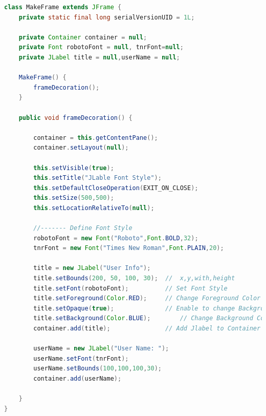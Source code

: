 \begin{frame}

\begin{lstlisting}[language=java]
class MakeFrame extends JFrame {
	private static final long serialVersionUID = 1L;
	
	private Container container = null;
	private Font robotoFont = null, tnrFont=null;
	private JLabel title = null,userName = null;
	
	MakeFrame() {
		frameDecoration();
	}
	
	public void frameDecoration() {

		container = this.getContentPane();
		container.setLayout(null);
		
		this.setVisible(true);
		this.setTitle("JLable Font Style");
		this.setDefaultCloseOperation(EXIT_ON_CLOSE);
		this.setSize(500,500);
		this.setLocationRelativeTo(null);
		
		//------- Define Font Style
		robotoFont = new Font("Roboto",Font.BOLD,32);
		tnrFont = new Font("Times New Roman",Font.PLAIN,20);
		
		title = new JLabel("User Info");
		title.setBounds(200, 50, 100, 30); 	//	x,y,with,height
		title.setFont(robotoFont);			// Set Font Style
		title.setForeground(Color.RED);		// Change Foreground Color
		title.setOpaque(true);				// Enable to change Background Color
		title.setBackground(Color.BLUE);		// Change Background Color
		container.add(title);				// Add Jlabel to Container
		
		userName = new JLabel("User Name: ");
		userName.setFont(tnrFont);
		userName.setBounds(100,100,100,30);
		container.add(userName);
		
	}
}
\end{lstlisting}


\end{frame}


